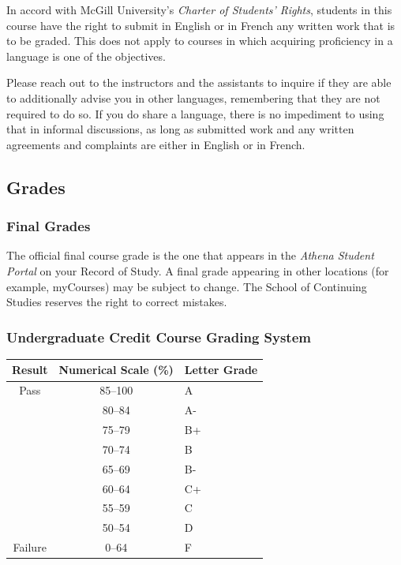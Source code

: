 \documentclass{article}
\begin{document}
In accord with McGill University's {\em Charter of Students' Rights},
students in this course have the right to submit in English or in
French any written work that is to be graded. This does not apply to
courses in which acquiring proficiency in a language is one of the
objectives.

Please reach out to the instructors and the assistants to inquire if
they are able to additionally advise you in other languages,
remembering that they are not required to do so. If you do share a
language, there is no impediment to using that in informal
discussions, as long as submitted work and any written agreements and
complaints are either in English or in French.

\subsection{Grades}

\subsubsection{Final Grades}

The official final course grade is the one that appears in the {\em
  Athena Student Portal} on your Record of Study. A final grade
appearing in other locations (for example, myCourses) may be subject
to change.  The School of Continuing Studies reserves the right to
correct mistakes.

\subsubsection{Undergraduate Credit Course Grading System}

\begin{center}
  \begin{tabular}{ccl}
     Result & Numerical Scale (\%) & Letter Grade \\
   \hline
Pass & 85--100 & A  \\
& 80--84 & A- \\
& 75--79 & B+ \\
& 70--74 & B \\
& 65--69 & B- \\
& 60--64& C+ \\
& 55--59 & C \\
& 50--54 & D \\
\hline
Failure & 0--64 & F 
  \end{tabular}
  \end{center}
\end{document}
